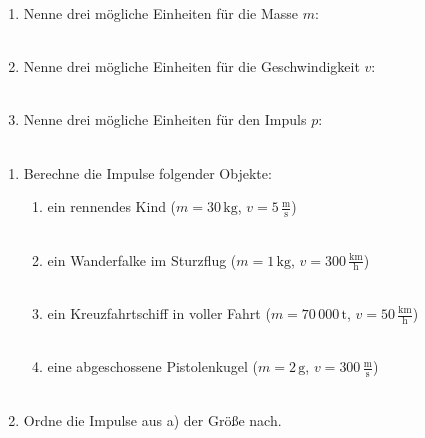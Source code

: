 \documentclass[task=1]{exercise}
\begin{document}
  \task[Einheiten]  
  \begin{enumerate}[label=\textnormal{\alph*)}]
   \item Nenne drei m\"ogliche Einheiten f\"ur die Masse $m$:\\\vspace{.1cm}\\
   \item Nenne drei m\"ogliche Einheiten f\"ur die Geschwindigkeit $v$:\\\vspace{.1cm}\\
   \item Nenne drei m\"ogliche Einheiten f\"ur den Impuls $p$:\\\vspace{.1cm}\\
   \end{enumerate}
   
   \begin{enumerate}[label=\textnormal{\alph*)}]
     \item Berechne die Impulse folgender Objekte:
     \begin{enumerate}[label=\textnormal{\roman*)}]
       \item ein rennendes Kind ($m = 30\,\mathrm{kg}$, $v = 5\,\frac{\mathrm{m}}{\mathrm{s}}$)\\\vspace{.3cm}\\
       \item ein Wanderfalke im Sturzflug ($m = 1\,\mathrm{kg}$, $v = 300\,\frac{\mathrm{km}}{\mathrm{h}}$)\\\vspace{.3cm}\\
       \item ein Kreuzfahrtschiff in voller Fahrt ($m = 70\,000\,\mathrm{t}$, $v = 50\,\frac{\mathrm{km}}{\mathrm{h}}$)\\\vspace{.3cm}\\
       \item eine abgeschossene Pistolenkugel ($m = 2\,\mathrm{g}$, $v = 300\,\frac{\mathrm{m}}{\mathrm{s}}$)\\\vspace{.3cm}\\
     \end{enumerate}
     \item Ordne die Impulse aus a) der Gr\"o{\ss}e nach.\\\vspace{.3cm}\\
   \end{enumerate}
   
\end{document}
